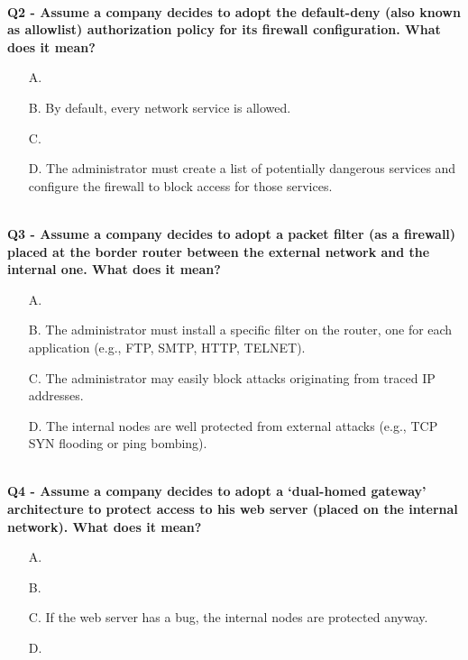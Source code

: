 \textbf{\\Q2 - Assume a company decides to adopt the default-deny (also known as allowlist) authorization policy for its firewall configuration. What does it mean?}
\begin{itemize}
    \item[A.] 
    \item[B.] By default, every network service is allowed.
    \item[C.] 
    \item[D.] The administrator must create a list of potentially dangerous services and configure the firewall to block access for those services.
\end{itemize}

\textbf{\\Q3 - Assume a company decides to adopt a packet filter (as a firewall) placed at the border router between the external network and the internal one. What does it mean?}
\begin{itemize}
    \item[A.] 
    \item[B.] The administrator must install a specific filter on the router, one for each application (e.g., FTP, SMTP, HTTP, TELNET).
    \item[C.] The administrator may easily block attacks originating from traced IP addresses.
    \item[D.] The internal nodes are well protected from external attacks (e.g., TCP SYN flooding or ping bombing).
\end{itemize}

\textbf{\\Q4 - Assume a company decides to adopt a ‘dual-homed gateway’ architecture to protect access to his web server (placed on the internal network). What does it mean?}
\begin{itemize}
    \item[A.] 
    \item[B.] 
    \item[C.] If the web server has a bug, the internal nodes are protected anyway. 
    \item[D.] 
\end{itemize}
\com{}

